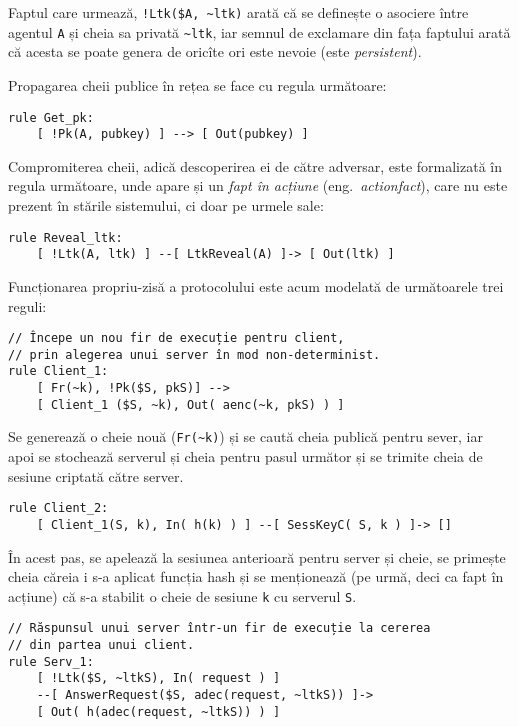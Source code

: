 Faptul care urmează, \texttt{!Ltk(\$A, \~{}ltk)} arată că se definește o asociere
între agentul \texttt{A} și cheia sa privată \texttt{\~{}ltk}, iar semnul
de exclamare din fața faptului arată că acesta se poate genera de oricîte
ori este nevoie (este \emph{persistent}).

Propagarea cheii publice în rețea se face cu regula următoare:

\begin{verbatim}
rule Get_pk:
    [ !Pk(A, pubkey) ] --> [ Out(pubkey) ]
\end{verbatim}

Compromiterea cheii, adică descoperirea ei de către adversar, este formalizată
în regula următoare, unde apare și un \emph{fapt în acțiune} (eng.\
\emph{actionfact}), care nu este prezent în stările sistemului, ci doar pe
urmele sale:

\begin{verbatim}
rule Reveal_ltk:
    [ !Ltk(A, ltk) ] --[ LtkReveal(A) ]-> [ Out(ltk) ]
\end{verbatim}

Funcționarea propriu-zisă a protocolului este acum modelată de următoarele
trei reguli:

\begin{verbatim}
// Începe un nou fir de execuție pentru client,
// prin alegerea unui server în mod non-determinist.
rule Client_1:
    [ Fr(~k), !Pk($S, pkS)] -->
    [ Client_1 ($S, ~k), Out( aenc(~k, pkS) ) ]
\end{verbatim}

Se generează o cheie nouă (\texttt{Fr(\~{}k)}) și se caută cheia publică
pentru sever, iar apoi se stochează serverul și cheia pentru pasul următor
și se trimite cheia de sesiune criptată către server.

\begin{verbatim}
rule Client_2:
    [ Client_1(S, k), In( h(k) ) ] --[ SessKeyC( S, k ) ]-> []
\end{verbatim}

În acest pas, se apelează la sesiunea anterioară pentru server și cheie,
se primește cheia căreia i s-a aplicat funcția hash și se menționează
(pe urmă, deci ca fapt în acțiune) că s-a stabilit o cheie de sesiune \texttt{k}
cu serverul \texttt{S}.

\begin{verbatim}
// Răspunsul unui server într-un fir de execuție la cererea
// din partea unui client.
rule Serv_1:
    [ !Ltk($S, ~ltkS), In( request ) ]
    --[ AnswerRequest($S, adec(request, ~ltkS)) ]->
    [ Out( h(adec(request, ~ltkS)) ) ]
\end{verbatim}

